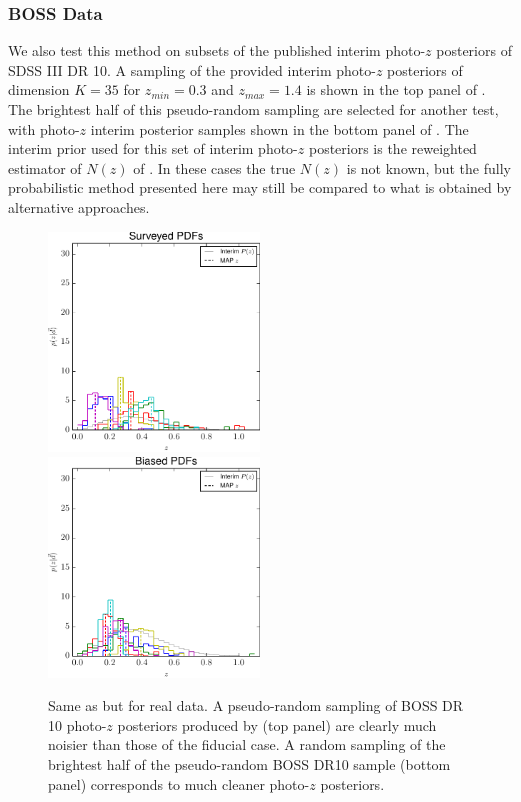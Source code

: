\subsubsection{BOSS Data}

We also test this method on subsets of the published interim photo-$z$ posteriors of SDSS III DR 10. 
A sampling of the provided interim photo-$z$ posteriors of dimension $K=35$ for $z_{min}=0.3$ and $z_{max}=1.4$ is shown in the top panel of .  
The brightest half of this pseudo-random sampling are selected for another test, with photo-$z$ interim posterior samples shown in the bottom panel of .  
The interim prior used for this set of interim photo-$z$ posteriors is the reweighted estimator of $N(z)$ of \citet{Sheldon2012}.  
In these cases the true $N(z)$ is not known, but the fully probabilistic method presented here may still be compared to what is obtained by alternative approaches.

\begin{figure}
	\includegraphics[width=0.5\textwidth]{figures/chippr/boss_samplepzs.pdf}\\
	\includegraphics[width=0.5\textwidth]{figures/chippr/bias_samplepzs.pdf}
	\caption{Same as  but for real data.  
		A pseudo-random sampling of BOSS DR 10 photo-$z$ posteriors produced by \citet{Sheldon2012} (top panel) are clearly much noisier than those of the fiducial case.  
		A random sampling of the brightest half of the pseudo-random BOSS DR10 sample (bottom panel) corresponds to much cleaner photo-$z$ posteriors.}
\end{figure}

